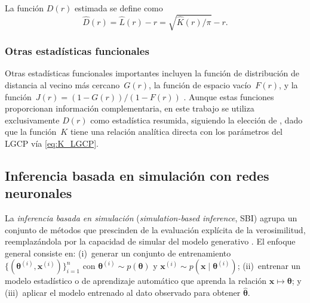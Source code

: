 \documentclass[a4paper,fleqn]{cas-sc}
\numberwithin{equation}{section}
\begin{document}
La funci\'on $D(r)$ estimada se define como
\begin{equation}
    \hat{D}(r) = \widehat{L}(r) - r = \sqrt{\widehat{K}(r)/\pi} - r.
    \label{eq:D_function}
\end{equation}

\subsubsection{Otras estad\'isticas funcionales}

Otras estad\'isticas funcionales importantes incluyen la funci\'on de
distribuci\'on de distancia al vecino m\'as cercano~$G(r)$, la funci\'on de
espacio vac\'io~$F(r)$, y la funci\'on~$J(r)=(1-G(r))/(1-F(r))$
\citep{VanLieshoutBaddeley1996, MollerWaagepetersen2004}. Aunque estas
funciones proporcionan informaci\'on complementaria, en este trabajo se
utiliza exclusivamente $D(r)$ como estad\'istica resumida, siguiendo la
elecci\'on de \citet{VIHRS2022}, dado que la funci\'on~$K$ tiene una relaci\'on
anal\'itica directa con los par\'ametros del LGCP v\'ia \eqref{eq:K_LGCP}.

\subsection{Inferencia basada en simulaci\'on con redes neuronales}
\label{sec:cnn_theory}

La \emph{inferencia basada en simulaci\'on} (\textit{simulation-based
inference}, SBI) agrupa un conjunto de m\'etodos que prescinden de la
evaluaci\'on expl\'icita de la verosimilitud, reemplaz\'andola por la capacidad
de simular del modelo generativo \citep{Cranmer2020}. El enfoque general
consiste en: (i)~generar un conjunto de entrenamiento
$\{(\boldsymbol{\theta}^{(i)},\mathbf{x}^{(i)})\}_{i=1}^{n}$ con
$\boldsymbol{\theta}^{(i)}\sim p(\boldsymbol{\theta})$ y
$\mathbf{x}^{(i)}\sim p(\mathbf{x}\mid\boldsymbol{\theta}^{(i)})$;
(ii)~entrenar un modelo estad\'istico o de aprendizaje autom\'atico que
aprenda la relaci\'on $\mathbf{x}\mapsto\boldsymbol{\theta}$; y
(iii)~aplicar el modelo entrenado al dato observado para obtener
$\hat{\boldsymbol{\theta}}$.
\end{document}
